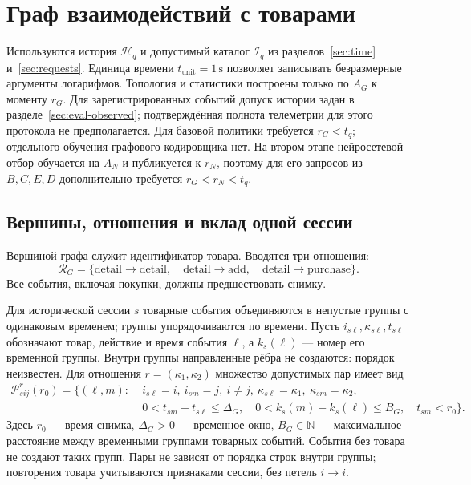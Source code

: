 \documentclass[12pt,a4paper]{article}
\newcommand{\N}{\mathbb N}
\theoremstyle{plainru}
\begin{document}
\section{Граф взаимодействий с товарами}\label{sec:model-graph}

Используются история \(\mathcal H_q\) и допустимый каталог
\(\mathcal I_q\) из разделов~\ref{sec:time} и~\ref{sec:requests}.
Единица времени \(t_{\mathrm{unit}}=1\,\mathrm{s}\) позволяет записывать
безразмерные аргументы логарифмов.
Топология и статистики построены только по $A_G$ к моменту $r_G$.
Для зарегистрированных событий допуск истории задан
в разделе~\ref{sec:eval-observed}; подтверждённая полнота телеметрии
для этого протокола не предполагается.
Для базовой политики требуется \(r_G<t_q\); отдельного обучения
графового кодировщика нет. На втором этапе нейросетевой отбор
обучается на \(A_N\) и публикуется к \(r_N\), поэтому для его запросов
из \(B,C,E,D\) дополнительно требуется \(r_G<r_N<t_q\).

\subsection{Вершины, отношения и вклад одной сессии}

Вершиной графа служит идентификатор товара. Вводятся три отношения:
\begin{equation}\label{eq:model-relations}
\mathcal R_G=
\{\mathrm{detail}\!\to\!\mathrm{detail},\quad
  \mathrm{detail}\!\to\!\mathrm{add},\quad
  \mathrm{detail}\!\to\!\mathrm{purchase}\}.
\end{equation}
Все события, включая покупки, должны предшествовать снимку.

Для исторической сессии $s$ товарные события объединяются в непустые
группы с одинаковым временем; группы упорядочиваются по времени.
Пусть $i_{s\ell},\kappa_{s\ell},t_{s\ell}$ обозначают товар, действие
и время события $\ell$, а $k_s(\ell)$ --- номер его временной группы.
Внутри группы направленные рёбра не создаются: порядок неизвестен.
Для отношения $r=(\kappa_1,\kappa_2)$ множество допустимых пар имеет вид
\begin{align}\label{eq:model-event-pairs}
\mathcal P^r_{sij}(r_0)=\{(\ell,m):\;&i_{s\ell}=i,
\ i_{sm}=j,\ i\ne j,\ \kappa_{s\ell}=\kappa_1,\ \kappa_{sm}=\kappa_2,\nonumber\\
&0<t_{sm}-t_{s\ell}\le\Delta_G,\quad
0<k_s(m)-k_s(\ell)\le B_G,\quad t_{sm}<r_0\}.
\end{align}
Здесь $r_0$ --- время снимка, $\Delta_G>0$ --- временное окно,
$B_G\in\N$ --- максимальное расстояние между временными группами
товарных событий. События без товара не создают таких групп.
Пары не зависят от порядка строк внутри группы; повторения товара
учитываются признаками сессии, без петель $i\to i$.
\end{document}

